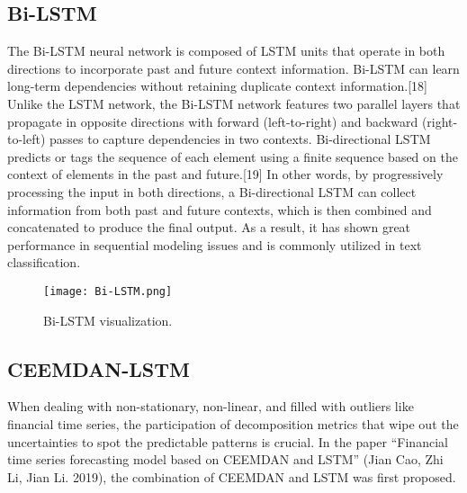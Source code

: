 \documentclass{ieeeojies}
\begin{document}
\subsection{Bi-LSTM}
The Bi-LSTM neural network is composed of LSTM units that operate in both directions to incorporate past and future context information. Bi-LSTM can learn long-term dependencies without retaining duplicate context information.[18]\\ 
Unlike the LSTM network, the Bi-LSTM network features two parallel layers that propagate in opposite directions with forward (left-to-right) and backward (right-to-left) passes to capture dependencies in two contexts.  Bi-directional LSTM predicts or tags the sequence of each element using a finite sequence based on the context of elements in the past and future.[19] In other words, by progressively processing the input in both directions, a Bi-directional LSTM can collect information from both past and future contexts, which is then combined and concatenated to produce the final output. As a result, it has shown great performance in sequential modeling issues and is commonly utilized in text classification. 
\begin{figure}[H]
	\centering
	\texttt{[image: Bi-LSTM.png]}
	\caption{Bi-LSTM visualization.\centering}
	\label{fig1}
\end{figure}

\subsection{CEEMDAN-LSTM}
When dealing with non-stationary, non-linear, and filled with outliers like financial time series, the participation of decomposition metrics that wipe out the uncertainties to spot the predictable patterns is crucial. In the paper “Financial time series forecasting model based on CEEMDAN and LSTM” (Jian Cao, Zhi Li, Jian Li. 2019), the combination of CEEMDAN and LSTM was first proposed.
\end{document}
